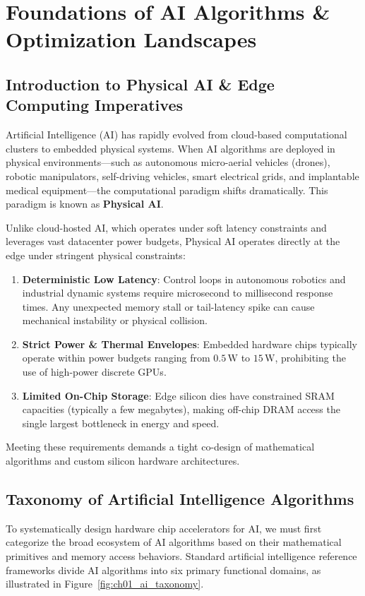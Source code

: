 \chapter{Foundations of AI Algorithms \& Optimization Landscapes}
\label{ch:foundations}

\section{Introduction to Physical AI \& Edge Computing Imperatives}
Artificial Intelligence (AI) has rapidly evolved from cloud-based computational clusters to embedded physical systems. When AI algorithms are deployed in physical environments---such as autonomous micro-aerial vehicles (drones), robotic manipulators, self-driving vehicles, smart electrical grids, and implantable medical equipment---the computational paradigm shifts dramatically. This paradigm is known as \textbf{Physical AI}.

Unlike cloud-hosted AI, which operates under soft latency constraints and leverages vast datacenter power budgets, Physical AI operates directly at the edge under stringent physical constraints:
\begin{enumerate}[leftmargin=*]
    \item \textbf{Deterministic Low Latency}: Control loops in autonomous robotics and industrial dynamic systems require microsecond to millisecond response times. Any unexpected memory stall or tail-latency spike can cause mechanical instability or physical collision.
    \item \textbf{Strict Power \& Thermal Envelopes}: Embedded hardware chips typically operate within power budgets ranging from $0.5\,\text{W}$ to $15\,\text{W}$, prohibiting the use of high-power discrete GPUs.
    \item \textbf{Limited On-Chip Storage}: Edge silicon dies have constrained SRAM capacities (typically a few megabytes), making off-chip DRAM access the single largest bottleneck in energy and speed.
\end{enumerate}

Meeting these requirements demands a tight co-design of mathematical algorithms and custom silicon hardware architectures.

\section{Taxonomy of Artificial Intelligence Algorithms}
To systematically design hardware chip accelerators for AI, we must first categorize the broad ecosystem of AI algorithms based on their mathematical primitives and memory access behaviors. Standard artificial intelligence reference frameworks divide AI algorithms into six primary functional domains, as illustrated in Figure~\ref{fig:ch01_ai_taxonomy}.

